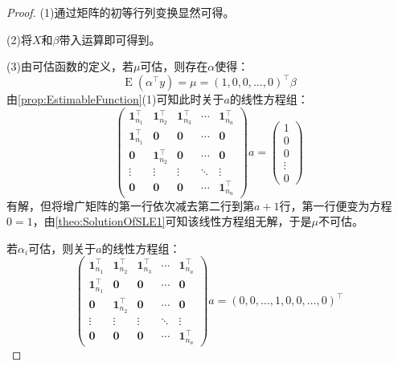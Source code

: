 \begin{proof}
	(1)通过矩阵的初等行列变换显然可得。\par
	(2)将$X$和$\beta$带入运算即可得到。\par
	(3)由可估函数的定义，若$\mu$可估，则存在$\alpha$使得：
	\begin{equation*}
		\operatorname{E}(\alpha^{\top}y)=\mu=(1,0,0,\dots,0)^{\top}\beta
	\end{equation*}
	由\cref{prop:EstimableFunction}(1)可知此时关于$a$的线性方程组：
	\begin{equation*}
		\begin{pmatrix}
			\mathbf{1}_{n_1}^{\top} & \mathbf{1}_{n_2}^{\top} & \mathbf{1}_{n_3}^{\top} & \cdots & \mathbf{1}_{n_a}^{\top} \\
			\mathbf{1}_{n_1}^{\top} & \mathbf{0} & \mathbf{0} & \cdots & \mathbf{0} \\
			\mathbf{0} & \mathbf{1}_{n_2}^{\top} & \mathbf{0} & \cdots & \mathbf{0} \\
			\vdots & \vdots & \vdots & \ddots & \vdots \\
			\mathbf{0} & \mathbf{0} & \mathbf{0} & \cdots & \mathbf{1}_{n_a}^{\top}
		\end{pmatrix}a=
		\begin{pmatrix}
			1 \\
			0 \\
			0 \\
			\vdots \\
			0
		\end{pmatrix}
	\end{equation*}
	有解，但将增广矩阵的第一行依次减去第二行到第$a+1$行，第一行便变为方程$0=1$，由\cref{theo:SolutionOfSLE1}可知该线性方程组无解，于是$\mu$不可估。\par
	若$\alpha_i$可估，则关于$a$的线性方程组：
	\begin{equation*}
		\begin{pmatrix}
			\mathbf{1}_{n_1}^{\top} & \mathbf{1}_{n_2}^{\top} & \mathbf{1}_{n_3}^{\top} & \cdots & \mathbf{1}_{n_a}^{\top} \\
			\mathbf{1}_{n_1}^{\top} & \mathbf{0} & \mathbf{0} & \cdots & \mathbf{0} \\
			\mathbf{0} & \mathbf{1}_{n_2}^{\top} & \mathbf{0} & \cdots & \mathbf{0} \\
			\vdots & \vdots & \vdots & \ddots & \vdots \\
			\mathbf{0} & \mathbf{0} & \mathbf{0} & \cdots & \mathbf{1}_{n_a}^{\top}
		\end{pmatrix}a=(0,0,\dots,1,0,0,\dots,0)^{\top}

\end{equation*}
\end{proof}
